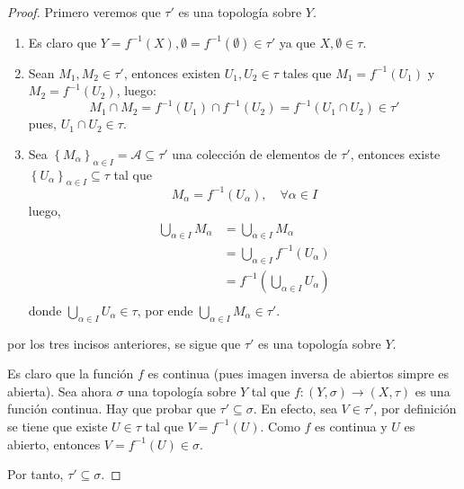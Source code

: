 \documentclass[12pt]{report}
\theoremstyle{largebreak}
\newcommand\cf[3]{\ensuremath{#1:#2\rightarrow#3}}
\begin{document}
    \begin{proof}
        Primero veremos que $\tau'$ es una topología sobre $Y$.
        \begin{enumerate}
            \item Es claro que $Y=f^{-1}(X),\emptyset=f^{-1}(\emptyset)\in\tau'$ ya que $X,\emptyset\in\tau$.
            \item Sean $M_1,M_2\in\tau'$, entonces existen $U_1,U_2\in\tau$ tales que $M_1=f^{-1}(U_1)$ y $M_2=f^{-1}(U_2)$, luego:
            \begin{equation*}
                M_1\cap M_2=f^{-1}(U_1)\cap f^{-1}(U_2)=f^{-1}(U_1\cap U_2)\in\tau'
            \end{equation*}
            pues, $U_1\cap U_2\in\tau$.
            \item  Sea $\left\{M_\alpha \right\}_{\alpha\in I}=\mathcal{A}\subseteq\tau'$ una colección de elementos de $\tau'$, entonces existe $\left\{U_\alpha \right\}_{\alpha\in I}\subseteq \tau$ tal que
            \begin{equation*}
                M_\alpha=f^{-1}(U_\alpha),\quad\forall\alpha\in I
            \end{equation*}
            luego,
            \begin{equation*}
                \begin{split}
                    \bigcup_{\alpha\in I}M_\alpha&=\bigcup_{\alpha\in I}M_\alpha\\
                    &=\bigcup_{\alpha\in I}f^{-1}(U_\alpha)\\
                    &=f^{-1}\left(\bigcup_{\alpha\in I}U_\alpha \right)\\
                \end{split}
            \end{equation*}
            donde $\bigcup_{\alpha\in I}U_\alpha\in\tau$, por ende $\bigcup_{\alpha\in I}M_\alpha\in\tau'$.
        \end{enumerate}
        por los tres incisos anteriores, se sigue que $\tau'$ es una topología sobre $Y$.

        Es claro que la función $f$ es continua (pues imagen inversa de abiertos simpre es abierta). Sea ahora $\sigma$ una topología sobre $Y$ tal que $\cf{f}{(Y,\sigma)}{(X,\tau)}$ es una función continua. Hay que probar que $\tau'\subseteq\sigma$. En efecto, sea $V\in\tau'$, por definición se tiene que existe $U\in\tau$ tal que $V=f^{-1}(U)$. Como $f$ es continua y $U$ es abierto, entonces $V=f^{-1}(U)\in\sigma$.

        Por tanto, $\tau'\subseteq\sigma$.
    \end{proof}
\end{document}
